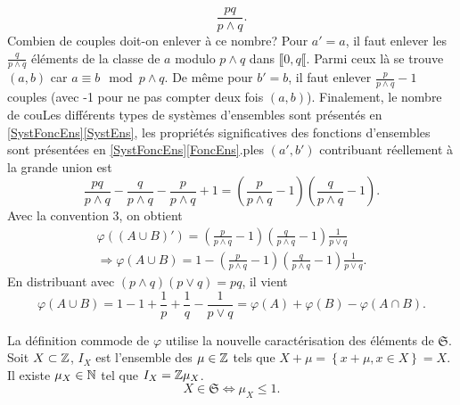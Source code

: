 \begin{enumerate}
\begin{displaymath}
  \frac{pq}{p \wedge q}.
\end{displaymath}
Combien de couples doit-on enlever à ce nombre?\newline
Pour $a' = a$, il faut enlever les $\frac{q}{p \wedge q}$ éléments de la classe de $a$ modulo $p \wedge q$ dans $\llbracket 0, q\llbracket$. Parmi ceux là se trouve $(a,b)$ car $a \equiv b \mod p\wedge q$. De même pour $b' = b$, il faut enlever $\frac{p}{p \wedge q}-1$ couples (avec -1 pour ne pas compter deux fois $(a,b)$).\newline
Finalement, le nombre de couLes différents types de systèmes d'ensembles sont présentés en \ref{SystFoncEns}\ref{SystEns}, les propriétés significatives des fonctions d'ensembles sont présentées en \ref{SystFoncEns}\ref{FoncEns}.ples $(a',b')$ contribuant réellement à la grande union est
\begin{displaymath}
  \frac{pq}{p \wedge q} - \frac{q}{p \wedge q} - \frac{p}{p \wedge q} + 1 = \left(\frac{p}{p \wedge q}-1\right) \left(\frac{q}{p \wedge q}-1\right).
\end{displaymath}
Avec la convention 3, on obtient
\begin{multline*}
  \varphi((A \cup B)') = \left(\frac{p}{p \wedge q}-1\right) \left(\frac{q}{p \wedge q}-1\right) \frac{1}{p \vee q}\\
  \Rightarrow
  \varphi(A \cup B) = 1 - \left(\frac{p}{p \wedge q}-1\right) \left(\frac{q}{p \wedge q}-1\right) \frac{1}{p \vee q}.
\end{multline*}
En distribuant avec $(p \wedge q)(p \vee q) = pq$, il vient
\begin{displaymath}
  \varphi(A \cup B) = 1 - 1 + \frac{1}{p} + \frac{1}{q} - \frac{1}{p \vee q} = \varphi(A) + \varphi(B) - \varphi(A\cap B).
\end{displaymath}
\end{enumerate}

La définition commode de $\varphi$ utilise la nouvelle caractérisation des éléments de $\mathfrak{S}$.\newline
Soit $X \subset \mathbb{Z}$, $I_X$ est l'ensemble des $\mu \in \mathbb{Z}$ tels que $X + \mu =\left\lbrace x + \mu , x\in X\right\rbrace = X$. Il existe $\mu_X \in \mathbb{N}$ tel que $I_X = \mathbb{Z} \mu_X$.
\begin{displaymath}
  X \in \mathfrak{S} \Leftrightarrow \mu_X \leq 1 .
\end{displaymath}

